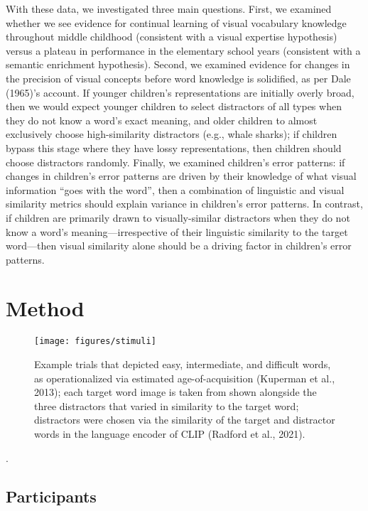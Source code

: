 \documentclass[
  man,mask]{apa6}
\begin{document}
With these data, we investigated three main questions. First, we examined whether we see evidence for continual learning of visual vocabulary knowledge throughout middle childhood (consistent with a visual expertise hypothesis) versus a plateau in performance in the elementary school years (consistent with a semantic enrichment hypothesis). Second, we examined evidence for changes in the precision of visual concepts before word knowledge is solidified, as per Dale (1965)'s account. If younger children's representations are initially overly broad, then we would expect younger children to select distractors of all types when they do not know a word's exact meaning, and older children to almost exclusively choose high-similarity distractors (e.g., whale sharks); if children bypass this stage where they have lossy representations, then children should choose distractors randomly. Finally, we examined children's error patterns: if changes in children's error patterns are driven by their knowledge of what visual information ``goes with the word'', then a combination of linguistic and visual similarity metrics should explain variance in children's error patterns. In contrast, if children are primarily drawn to visually-similar distractors when they do not know a word's meaning---irrespective of their linguistic similarity to the target word---then visual similarity alone should be a driving factor in children's error patterns.

\section{Method}\label{method}

\begin{figure}[H]

{\centering \texttt{[image: figures/stimuli]} 

}

\caption{Example trials that depicted easy, intermediate, and difficult words, as operationalized via estimated age-of-acquisition (Kuperman et al., 2013); each target word image is taken from shown alongside the three distractors that varied in similarity to the target word; distractors were chosen via the similarity of the target and distractor words in the language encoder of CLIP (Radford et al., 2021). }\label{fig:procedure-figure}
\end{figure}

.

\subsection{Participants}\label{participants}
\end{document}
